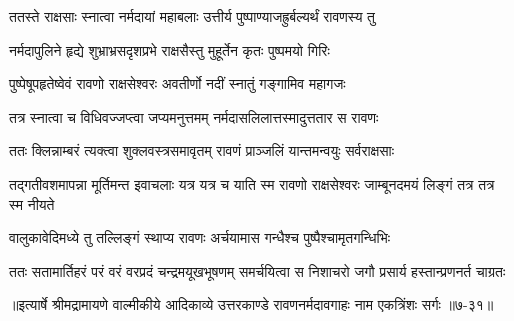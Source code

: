 \twolineshloka
{ततस्ते राक्षसाः स्नात्वा नर्मदायां महाबलाः}
{उत्तीर्य पुष्पाण्याजह्रुर्बल्यर्थं रावणस्य तु} %

\twolineshloka
{नर्मदापुलिने हृद्ये शुभ्राभ्रसदृशप्रभे}
{राक्षसैस्तु मुहूर्तेन कृतः पुष्पमयो गिरिः} %

\twolineshloka
{पुष्पेषूपहृतेष्वेवं रावणो राक्षसेश्वरः}
{अवतीर्णो नदीं स्नातुं गङ्गामिव महागजः} %

\twolineshloka
{तत्र स्नात्वा च विधिवज्जप्त्वा जप्यमनुत्तमम्}
{नर्मदासलिलात्तस्मादुत्ततार स रावणः} %

\twolineshloka
{ततः क्लिन्नाम्बरं त्यक्त्वा शुक्लवस्त्रसमावृतम्}
{रावणं प्राञ्जलिं यान्तमन्वयुः सर्वराक्षसाः} %

\threelineshloka
{तद्गतीवशमापन्ना मूर्तिमन्त इवाचलाः}
{यत्र यत्र च याति स्म रावणो राक्षसेश्वरः}
{जाम्बूनदमयं लिङ्गं तत्र तत्र स्म नीयते} %

\twolineshloka
{वालुकावेदिमध्ये तु तल्लिङ्गं स्थाप्य रावणः}
{अर्चयामास गन्धैश्च पुष्पैश्चामृतगन्धिभिः} %

\twolineshloka
{ततः सतामार्तिहरं परं वरं वरप्रदं चन्द्रमयूखभूषणम्}
{समर्चयित्वा स निशाचरो जगौ प्रसार्य हस्तान्प्रणनर्त चाग्रतः} %


॥इत्यार्षे श्रीमद्रामायणे वाल्मीकीये आदिकाव्ये उत्तरकाण्डे रावणनर्मदावगाहः नाम एकत्रिंशः सर्गः ॥७-३१॥
